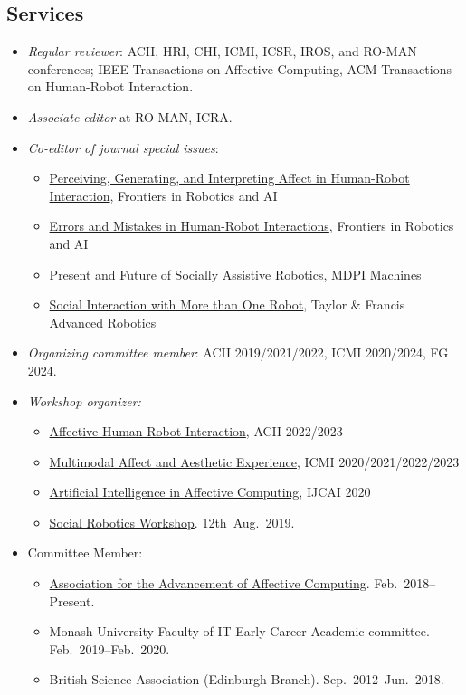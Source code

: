 \documentclass[11pt,letterpaper]{article}
\begin{document}
\subsection*{Services}
\begin{itemize}
  \item \emph{Regular reviewer}: ACII, HRI, CHI, ICMI, ICSR, IROS, and RO-MAN conferences; IEEE Transactions on Affective Computing, ACM Transactions on Human-Robot Interaction.
  \item \emph{Associate editor} at RO-MAN, ICRA.
  \item \emph{Co-editor of journal special issues}:
  \begin{itemize}
  	\item \href{https://www.frontiersin.org/research-topics/57098/perceiving-generating-and-interpreting-affect-in-human-robot-interaction-hri}{Perceiving, Generating, and Interpreting Affect in Human-Robot Interaction}, Frontiers in Robotics and AI
  	\item \href{https://www.frontiersin.org/research-topics/64147/errors-and-mistakes-in-human-robot-interactions}{Errors and Mistakes in Human-Robot Interactions}, Frontiers in Robotics and AI
  	\item \href{https://www.mdpi.com/journal/machines/special_issues/LY20492KE2}{Present and Future of Socially Assistive Robotics}, MDPI Machines
  	\item \href{https://think.taylorandfrancis.com/special_issues/advanced-robotics-social-interaction/?utm_source=TFO&utm_medium=cms&utm_campaign=JPG15743}{Social Interaction with More than One Robot}, Taylor \& Francis Advanced Robotics
  \end{itemize} 
  \item \emph{Organizing committee member}: ACII 2019/2021/2022, ICMI 2020/2024, FG 2024.
  \item \emph{Workshop organizer:}
  \begin{itemize}
  	\item \href{https://www.a-hri.me/}{Affective Human-Robot Interaction}, ACII 2022/2023
  	\item \href{https://sites.google.com/view/maae2022/home?authuser=0}{Multimodal Affect and Aesthetic Experience}, ICMI 2020/2021/2022/2023
  	\item \href{https://kdd.cs.ksu.edu/Workshops/IJCAI-2020-AffComp/}{Artificial Intelligence in Affective Computing}, IJCAI 2020
  	\item \href{https://sites.google.com/monash.edu/socialroboticsworkshop/home}{Social Robotics Workshop}. 12th~Aug.~2019.
  \end{itemize}
  \item Committee Member:
  \begin{itemize} 
    \item \href{https://aaac.world/}{Association for the Advancement of Affective Computing}. Feb.~2018--Present.
    \item Monash University Faculty of IT Early Career Academic committee. Feb.~2019--Feb.~2020.
    \item British Science Association (Edinburgh Branch). Sep.~2012--Jun.~2018.
  \end{itemize}
\end{itemize}
\end{document}
